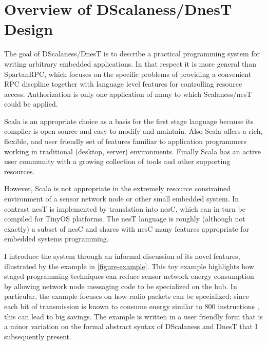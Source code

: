 \section{Overview of DScalaness/DnesT Design}

The goal of DScalaness/DnesT is to describe a practical programming system for writing arbitrary
embedded applications. In that respect it is more general than SpartanRPC, which focuses on the
specific problems of providing a convenient RPC discpline together with language level features
for controlling resource access. Authorization is only one application of many to which
Scalaness/nesT could be applied.

Scala is an appropriate choice as a basis for the first stage language because its compiler is
open source and easy to modify and maintain. Also Scala offers a rich, flexible, and user
friendly set of features familiar to application programmers working in traditional (desktop,
server) environments. Finally Scala has an active user community with a growing collection of
tools and other supporting resources.

However, Scala is not appropriate in the extremely resource constrained environment of a sensor
network node or other small embedded system. In contrast nesT is implemented by translation into
nesC, which can in turn be compiled for TinyOS platforms. The nesT language is roughly (although
not exactly) a subset of nesC and shares with nesC many features appropriate for embedded
systems programming.

I introduce the system through an informal discussion of its novel features, illustrated by the
example in \autoref{figure-example}. This toy example highlights how staged programming
techniques can reduce sensor network energy consumption by allowing network node messaging code
to be specialized on the hub. In particular, the example focuses on how radio packets can be
specialized; since each bit of transmission is known to consume energy similar to 800
instructions \cite{tag}, this can lead to big savings. The example is written in a user friendly
form that is a minor variation on the formal abstract syntax of DScalaness and DnesT that I
subsequently present.

